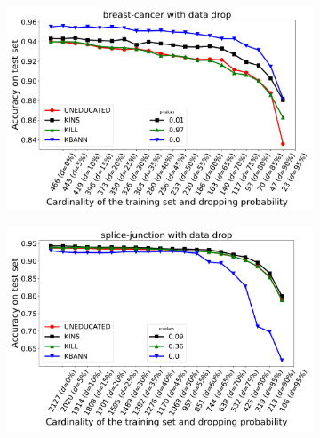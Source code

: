 
\newcommand{\cellsize}{0.3\linewidth}

\begin{figure}%
	\centering
	\begin{subfigure}{\cellsize}
		\caption{}
		\label{fig:bcw-drop}
		\includegraphics[width=\linewidth]{figures/drop/breast-cancer/uneducated-kins-kill-kbann-accuracy-average-curves}
	\end{subfigure}\hfil
	\begin{subfigure}{\cellsize}
		\caption{}
		\label{fig:psjgs-drop}
		\includegraphics[width=\linewidth]{figures/drop/splice-junction/uneducated-kins-kill-kbann-accuracy-average-curves}
	\end{subfigure}\hfil
	\begin{subfigure}{\cellsize}
		\caption{}
		\label{fig:ci-drop}

\end{subfigure}
\end{figure}
